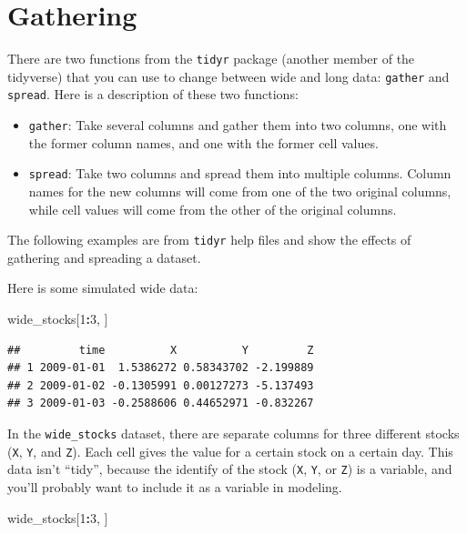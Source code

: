 \documentclass[]{book}
\makeatletter
\newenvironment{Shaded}{\begin{snugshade}}{\end{snugshade}}
\newcommand{\DecValTok}[1]{\textcolor[rgb]{0.00,0.00,0.81}{#1}}
\newcommand{\OperatorTok}[1]{\textcolor[rgb]{0.81,0.36,0.00}{\textbf{#1}}}
\newcommand{\NormalTok}[1]{#1}
\providecommand{\tightlist}{%
  \setlength{\itemsep}{0pt}\setlength{\parskip}{0pt}}
\newenvironment{kframe}{%
\medskip{}
\setlength{\fboxsep}{.8em}
 \def\at@end@of@kframe{}%
 \ifinner\ifhmode%
  \def\at@end@of@kframe{\end{minipage}}%
  \begin{minipage}{\columnwidth}%
 \fi\fi%
 \def\FrameCommand##1{\hskip\@totalleftmargin \hskip-\fboxsep
 \colorbox{shadecolor}{##1}\hskip-\fboxsep
     \hskip-\linewidth \hskip-\@totalleftmargin \hskip\columnwidth}%
 \MakeFramed {\advance\hsize-\width
   \@totalleftmargin\z@ \linewidth\hsize
   \@setminipage}}%
 {\par\unskip\endMakeFramed%
 \at@end@of@kframe}
\renewenvironment{Shaded}{\begin{kframe}}{\end{kframe}}
\theoremstyle{definition}
\theoremstyle{definition}
\theoremstyle{definition}
\theoremstyle{remark}
\makeatother
\begin{document}
\section{Gathering}\label{gathering}

There are two functions from the \texttt{tidyr} package (another member
of the tidyverse) that you can use to change between wide and long data:
\texttt{gather} and \texttt{spread}. Here is a description of these two
functions:

\begin{itemize}
\tightlist
\item
  \texttt{gather}: Take several columns and gather them into two
  columns, one with the former column names, and one with the former
  cell values.
\item
  \texttt{spread}: Take two columns and spread them into multiple
  columns. Column names for the new columns will come from one of the
  two original columns, while cell values will come from the other of
  the original columns.
\end{itemize}

The following examples are from \texttt{tidyr} help files and show the
effects of gathering and spreading a dataset.

Here is some simulated wide data:

\begin{Shaded}
\begin{Highlighting}[]
\NormalTok{wide_stocks[}\DecValTok{1}\OperatorTok{:}\DecValTok{3}\NormalTok{, ]}
\end{Highlighting}
\end{Shaded}

\begin{verbatim}
##         time          X          Y         Z
## 1 2009-01-01  1.5386272 0.58343702 -2.199889
## 2 2009-01-02 -0.1305991 0.00127273 -5.137493
## 3 2009-01-03 -0.2588606 0.44652971 -0.832267
\end{verbatim}

In the \texttt{wide\_stocks} dataset, there are separate columns for
three different stocks (\texttt{X}, \texttt{Y}, and \texttt{Z}). Each
cell gives the value for a certain stock on a certain day. This data
isn't ``tidy'', because the identify of the stock (\texttt{X},
\texttt{Y}, or \texttt{Z}) is a variable, and you'll probably want to
include it as a variable in modeling.

\begin{Shaded}
\begin{Highlighting}[]
\NormalTok{wide_stocks[}\DecValTok{1}\OperatorTok{:}\DecValTok{3}\NormalTok{, ]}
\end{Highlighting}
\end{Shaded}
\end{document}
